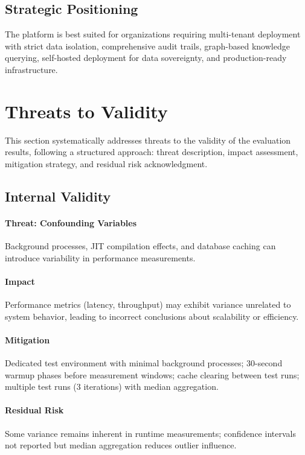\documentclass[a4paper,twoside]{sapthesis}
\begin{document}
\subsection{Strategic Positioning}

The platform is best suited for organizations requiring multi-tenant deployment with strict data isolation, comprehensive audit trails, graph-based knowledge querying, self-hosted deployment for data sovereignty, and production-ready infrastructure.

\section{Threats to Validity}
\label{sec:threats-validity}

This section systematically addresses threats to the validity of the evaluation results, following a structured approach: threat description, impact assessment, mitigation strategy, and residual risk acknowledgment.

\subsection{Internal Validity}

\paragraph{Threat: Confounding Variables}
Background processes, JIT compilation effects, and database caching can introduce variability in performance measurements.

\paragraph{Impact}
Performance metrics (latency, throughput) may exhibit variance unrelated to system behavior, leading to incorrect conclusions about scalability or efficiency.

\paragraph{Mitigation}
Dedicated test environment with minimal background processes; 30-second warmup phases before measurement windows; cache clearing between test runs; multiple test runs (3 iterations) with median aggregation.

\paragraph{Residual Risk}
Some variance remains inherent in runtime measurements; confidence intervals not reported but median aggregation reduces outlier influence.
\end{document}

